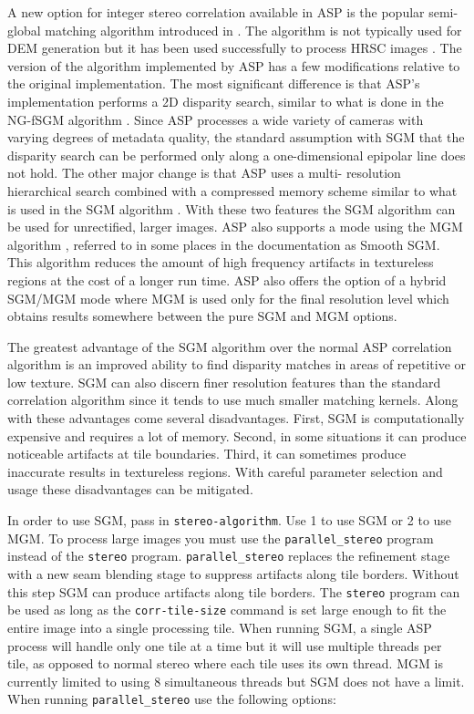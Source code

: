A new option for integer stereo correlation available in ASP is the 
popular semi-global matching algorithm introduced in 
\citep{hirschmuller_sgm_original}.  The algorithm is not typically used for
DEM generation but it has been used successfully to process HRSC images
\citep{hirschmuller_hrsc_with_sgm}.  The version of the algorithm implemented
by ASP has a few modifications relative to the original implementation.  The
most significant difference is that ASP's implementation performs a 2D disparity
search, similar to what is done in the NG-fSGM algorithm 
\citep{xiang_2016_low_complexity_fsgm}.  Since ASP processes a wide variety of
cameras with varying degrees of metadata quality, the standard assumption 
with SGM that the disparity search can be performed only along a one-dimensional 
epipolar line does not hold.  The other major change is that ASP uses a multi-
resolution hierarchical search combined with a compressed memory scheme similar
to what is used in the SGM algorithm \citep{rothermel2012sure_isgm}.  With
these two features the SGM algorithm can be used for unrectified, larger images.
ASP also supports a mode using the MGM algorithm \citep{facciolo2015mgm}, 
referred to in some places in the documentation as Smooth SGM.  This algorithm 
reduces the amount of high frequency artifacts in textureless regions at the 
cost of a longer run time.  ASP also offers the option of a hybrid SGM/MGM mode
where MGM is used only for the final resolution level which obtains results
somewhere between the pure SGM and MGM options.

The greatest advantage of the SGM algorithm over the normal ASP correlation algorithm
is an improved ability to find disparity matches in areas of repetitive or low texture.
SGM can also discern finer resolution features than the standard correlation algorithm
since it tends to use much smaller matching kernels.  Along with these advantages come several disadvantages.
First,  SGM is computationally expensive and requires a lot of memory.  Second, in some
situations it can produce noticeable artifacts at tile boundaries.  Third, it can 
sometimes produce inaccurate results in textureless regions.  With careful parameter
selection and usage these disadvantages can be mitigated.

In order to use SGM, pass in \texttt{stereo-algorithm}.  Use 1 to use SGM or 2 to use MGM.
To process large images you must use the \texttt{parallel\_stereo} program instead 
of the \texttt{stereo} program.  \texttt{parallel\_stereo} replaces the refinement stage 
with a new seam blending stage to suppress artifacts along tile borders.  Without this step
SGM can produce artifacts along tile borders.  The 
\texttt{stereo} program can be used as long as the \texttt{corr-tile-size} command
is set large enough to fit the entire image into a single processing tile.
When running SGM, a single ASP  process will handle only one tile at a time but it 
will use multiple threads per tile, as opposed to normal stereo where each tile uses its 
own thread.  MGM is currently limited to using 8 simultaneous threads but SGM does not have a limit.
When running \texttt{parallel\_stereo} use the following options:

